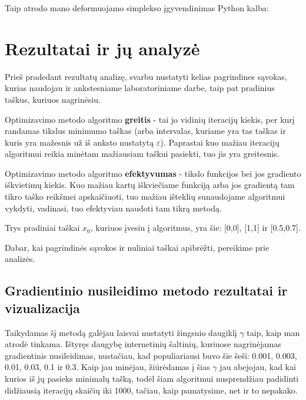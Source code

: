 \documentclass{article}
\begin{document}
Taip atrodo mano deformuojamo simplekso įgyvendinimas Python kalba:
\section{Rezultatai ir jų analyzė}
Prieš pradedant rezultatų analizę, svarbu nustatyti kelias pagrindines sąvokas, kurias naudojau ir ankstesniame laboratoriniame darbe, taip pat pradinius taškus, kuriuos nagrinėsiu.

Optimizavimo metodo algoritmo \textbf{greitis} - tai jo vidinių iteracijų kiekis, per kurį randamas tikslus minimumo taškas (arba intervalas, kuriame yra tas taškas ir kuris yra mažesnis už iš anksto nustatytą $\varepsilon$). Paprastai kuo mažiau iteracijų algoritmui reikia minėtam mažiausiam taškui pasiekti, tuo jis yra greitesnis. 

Optimizavimo metodo algoritmo \textbf{efektyvumas} - tikslo funkcijos bei jos gradiento iškvietimų kiekis. Kuo mažiau kartų iškviečiame funkciją arba jos gradientą tam tikro taško reikšmei apskaičiuoti, tuo mažiau išteklių sunaudojame algoritmui vykdyti, vadinasi, tuo efektyviau naudoti tam tikrą metodą. 

Trys pradiniai taškai $x_{0}$, kuriuos įvesiu į algoritmus, yra šie: [0,0], [1,1] ir [0.5,0.7].

Dabar, kai pagrindinės sąvokos ir nuliniai taškai apibrėžti, pereikime prie analizės.
\subsection{Gradientinio nusileidimo metodo rezultatai ir vizualizacija}
Taikydamas šį metodą galėjau laisvai nustatyti žingsnio daugiklį $\gamma$ taip, kaip man atrodė tinkama. Ištyręs daugybę internetinių šaltinių, kuriuose nagrinėjamas gradientinis nusileidimas, nustačiau, kad populiariausi buvo šie šeši: 0.001, 0.003, 0.01, 0.03, 0.1 ir 0.3. Kaip jau minėjau, žiūrėdamas į šias $\gamma$ jau abejojau, kad kai kurios iš jų pasieks minimalų tašką, todėl šiam algoritmui nusprendžiau padidinti didžiausią iteracijų skaičių iki 1000, tačiau, kaip pamatysime, net ir to nepakako. 
\end{document}
